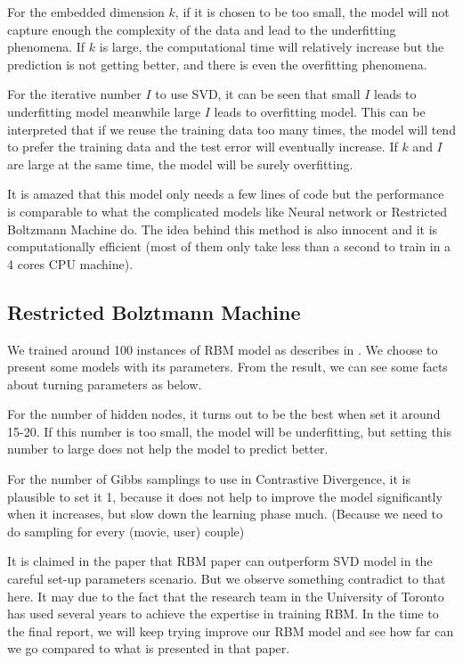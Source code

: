 \documentclass[bj, preprint]{imsart}
\begin{document}
For the embedded dimension $k$, if it is chosen to be too small, the model will not capture enough the complexity of the data and lead to the underfitting phenomena. If $k$ is large, the computational time will relatively increase but the prediction is not getting better, and there is even the overfitting phenomena. 

For the iterative number $I$ to use SVD, it can be seen that small $I$ leads to underfitting model meanwhile large $I$ leads to overfitting model. This can be interpreted that if we reuse the training data too many times, the model will tend to prefer the training data and the test error will eventually increase. If $k$ and $I$ are large at the same time, the model will be surely overfitting.

It is amazed that this model only needs a few lines of code but the performance is comparable to what the complicated models like Neural network or Restricted Boltzmann Machine do. The idea behind this method is also innocent and it is computationally efficient (most of them only take less than a second to train in a 4 cores CPU machine).     



\subsection{Restricted Bolztmann Machine}\label{sebsec:results.rbm}

We trained around 100 instances of RBM model as describes in . We choose to present some models with its parameters. From the result, we can see some facts about turning parameters as below.

For the number of hidden nodes, it turns out to be the best when set it around 15-20. If this number is too small, the model will be underfitting, but setting this number to large does not help the model to predict better.

For the number of Gibbs samplings to use in Contrastive Divergence, it is plausible to set it 1, because it does not help to improve the model significantly when it increases, but slow down the learning phase much. (Because we need to do sampling for every (movie, user) couple)

It is claimed in the paper \cite{10.1145/1273496.1273596} that RBM paper can outperform SVD model in the careful set-up parameters scenario. But we observe something contradict to that here. It may due to the fact that the research team in the University of Toronto has used several years to achieve the expertise in training RBM. In the time to the final report, we will keep trying improve our RBM model and see how far can we go compared to what is presented in that paper.
\end{document}
